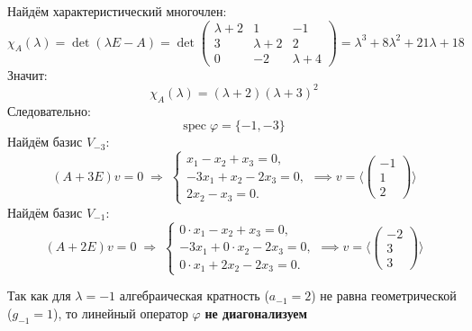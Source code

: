 \documentclass[a4paper]{article}
\renewcommand{\phi}{\varphi}
\begin{document}
\begin{enumerate}
\begin{enumerate}
    \end{enumerate}
    Найдём характеристический многочлен:
    $$
    \chi_A(\lambda)=\det(\lambda E - A)
    =\det\begin{pmatrix}
    \lambda+2 & 1 & -1\\
    3 & \lambda+2 & 2\\
    0 & -2 & \lambda+4
    \end{pmatrix}
    =\lambda^3+8\lambda^2+21\lambda+18
    $$
    Значит:
    $$\chi_A(\lambda)=(\lambda+2)(\lambda+3)^2$$
    Следовательно:
    $$\text{spec}\; \phi = \{-1, -3\}$$
    Найдём базис $V_{-3}$:
    $$
    (A+3E)v=0
    \;\Longrightarrow\;
    \begin{cases}
    x_1 - x_2 + x_3 =0,\\
    -3x_1 + x_2 -2x_3 =0,\\
    2x_2 - x_3 =0.
    \end{cases}
    \implies 
    v=\langle \begin{pmatrix}-1\\1\\2\end{pmatrix} \rangle
    $$
    Найдём базис $V_{-1}$:
    $$
    (A+2E)v=0
    \;\Longrightarrow\;
    \begin{cases}
    0\cdot x_1 - x_2 + x_3 =0,\\
    -3x_1 + 0\cdot x_2 -2x_3 =0,\\
    0\cdot x_1 +2x_2 -2x_3 =0.
    \end{cases} \implies 
    v = \langle \begin{pmatrix}-2\\3\\3\end{pmatrix}\rangle
    $$

    Так как для $\lambda = -1$ алгебраическая кратность ($a_{-1} = 2$) не равна геометрической ($g_{-1} = 1$), то линейный оператор $\phi$ \textbf{не диагонализуем}\\


\end{enumerate}
\end{document}
